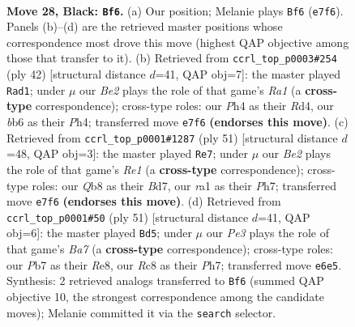 \documentclass[11pt]{article}
\begin{document}
\clearpage

\begin{figure}[p]\centering
\begin{subfigure}{0.46\textwidth}\centering
\resizebox{\linewidth}{!}{%
\newchessgame
\chessboard[
  setfen={1qr5/rp2bpk1/pB2p3/8/3Q3p/4PP2/PP4PP/R3R1K1 b - - 1 28},
  showmover=false,
  pgfstyle=straightmove, color=movearrow, markmove={e7-f6}
]}
\caption{}
\end{subfigure}\hfill
\begin{subfigure}{0.46\textwidth}\centering
\resizebox{\linewidth}{!}{%
\newchessgame
\chessboard[
  setfen={r3r1k1/p3bp1p/1p2q1pB/8/3R3P/2P2QP1/P4P2/R5K1 w - - 3 22},
  showmover=false,
  pgfstyle=straightmove, color=movearrow, markmove={a1-d1}
]}
\caption{}
\end{subfigure}
\\[4pt]
\begin{subfigure}{0.46\textwidth}\centering
\resizebox{\linewidth}{!}{%
\newchessgame
\chessboard[
  setfen={r3r1k1/2pb3p/1q1p2p1/pp1P4/5P2/5B1P/PPQ2RPK/5R2 b - - 4 26},
  showmover=false,
  pgfstyle=straightmove, color=movearrow, markmove={e8-e7}
]}
\caption{}
\end{subfigure}\hfill
\begin{subfigure}{0.46\textwidth}\centering
\resizebox{\linewidth}{!}{%
\newchessgame
\chessboard[
  setfen={r3r1k1/5ppp/8/pp2q3/8/P3PB1P/b1Q2PP1/2R2R1K b - - 1 26},
  showmover=false,
  pgfstyle=straightmove, color=movearrow, markmove={a2-d5}
]}
\caption{}
\end{subfigure}
\caption{\textbf{Move 28, Black: \texttt{Bf6}.} (a) Our position; Melanie plays \texttt{Bf6} (\texttt{e7f6}). Panels (b)--(d) are the retrieved master positions whose correspondence most drove this move (highest QAP objective among those that transfer to it). (b) Retrieved from \texttt{ccrl\_top\_p0003\#254} (ply 42) [structural distance $d$=41, QAP obj=7]: the master played \texttt{Rad1}; under $\mu$ our \emph{Be2} plays the role of that game's \emph{Ra1} (a \textbf{cross-type} correspondence); cross-type roles: our \emph{P}h4 as their \emph{R}d4, our \emph{b}b6 as their \emph{P}h4; transferred move \texttt{e7f6} \textbf{(endorses this move)}. (c) Retrieved from \texttt{ccrl\_top\_p0001\#1287} (ply 51) [structural distance $d$=48, QAP obj=3]: the master played \texttt{Re7}; under $\mu$ our \emph{Be2} plays the role of that game's \emph{Re1} (a \textbf{cross-type} correspondence); cross-type roles: our \emph{Q}b8 as their \emph{B}d7, our \emph{r}a1 as their \emph{P}h7; transferred move \texttt{e7f6} \textbf{(endorses this move)}. (d) Retrieved from \texttt{ccrl\_top\_p0001\#50} (ply 51) [structural distance $d$=41, QAP obj=6]: the master played \texttt{Bd5}; under $\mu$ our \emph{Pe3} plays the role of that game's \emph{Ba7} (a \textbf{cross-type} correspondence); cross-type roles: our \emph{P}b7 as their \emph{R}e8, our \emph{R}c8 as their \emph{P}h7; transferred move \texttt{e6e5}. Synthesis: 2 retrieved analogs transferred to \texttt{Bf6} (summed QAP objective 10, the strongest correspondence among the candidate moves); Melanie committed it via the \texttt{search} selector.}
\label{fig:thought-m55}
\end{figure}
\end{document}
